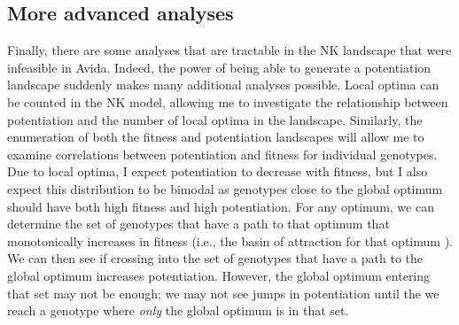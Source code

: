
\subsection{More advanced analyses} 

Finally, there are some analyses that are tractable in the NK landscape that were infeasible in Avida.
Indeed, the power of being able to generate a potentiation landscape suddenly makes many additional analyses possible. %
Local optima can be counted in the NK model, allowing me to investigate the relationship between potentiation and the number of local optima in the landscape. 
Similarly, the enumeration of both the fitness and potentiation landscapes will allow me to examine correlations between potentiation and fitness for individual genotypes. 
Due to local optima, I expect potentiation to decrease with fitness, but I also expect this distribution to be bimodal as genotypes close to the global optimum should have both high fitness and high potentiation. 
For any optimum, we can determine the set of genotypes that have a path to that optimum that monotonically increases in fitness (i.e., the basin of attraction for that optimum \citep{ostmanPredictingEvolutionVisualizing2014}). 
We can then see if crossing into the set of genotypes that have a path to the global optimum increases potentiation. 
However, the global optimum entering that set may not be enough; we may not see jumps in potentiation until the we reach a genotype where \textit{only} the global optimum is in that set.


